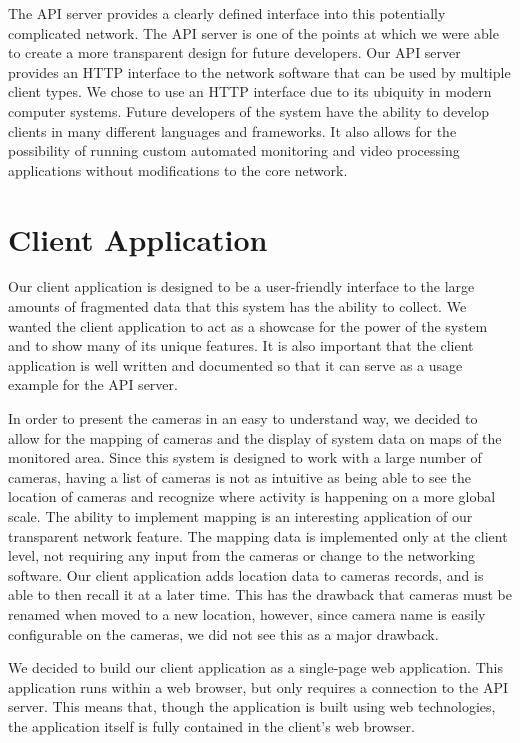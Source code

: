 The API server provides a clearly defined interface into this potentially
complicated network. The API server is one of the points at which we were able
to create a more transparent design for future developers. Our API server
provides an HTTP interface to the network software that can be used by multiple
client types. We chose to use an HTTP interface due to its ubiquity in modern
computer systems. Future developers of the system have the ability to develop
clients in many different languages and frameworks. It also allows for the
possibility of running custom automated monitoring and video processing
applications without modifications to the core network.

\section{Client Application}

Our client application is designed to be a user-friendly interface to the large
amounts of fragmented data that this system has the ability to collect. We
wanted the client application to act as a showcase for the power of the system
and to show many of its unique features. It is also important that the client
application is well written and documented so that it can serve as a usage
example for the API server.

In order to present the cameras in an easy to understand way, we decided to
allow for the mapping of cameras and the display of system data on maps of the
monitored area. Since this system is designed to work with a large number of
cameras, having a list of cameras is not as intuitive as being able to see the
location of cameras and recognize where activity is happening on a more global
scale. The ability to implement mapping is an interesting application of our
transparent network feature. The mapping data is implemented only at the client
level, not requiring any input from the cameras or change to the networking
software. Our client application adds location data to cameras records, and is
able to then recall it at a later time.  This has the drawback that cameras must
be renamed when moved to a new location, however, since camera name is easily
configurable on the cameras, we did not see this as a major drawback.

We decided to build our client application as a single-page web application.
This application runs within a web browser, but only requires a connection to
the API server. This means that, though the application is built using web
technologies, the application itself is fully contained in the client's web
browser.

